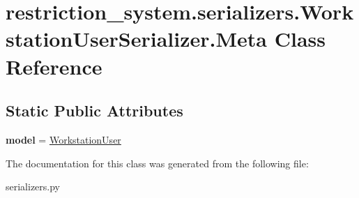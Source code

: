 \hypertarget{classrestriction__system_1_1serializers_1_1WorkstationUserSerializer_1_1Meta}{}\section{restriction\+\_\+system.\+serializers.\+Workstation\+User\+Serializer.\+Meta Class Reference}
\label{classrestriction__system_1_1serializers_1_1WorkstationUserSerializer_1_1Meta}
\subsection*{Static Public Attributes}
\begin{DoxyCompactItemize}
\item 
\hypertarget{classrestriction__system_1_1serializers_1_1WorkstationUserSerializer_1_1Meta_a333b4209c5ec6f651a45c3ef2574cccd}{}{\bfseries model} = \hyperlink{classrestriction__system_1_1models_1_1WorkstationUser}{Workstation\+User}\label{classrestriction__system_1_1serializers_1_1WorkstationUserSerializer_1_1Meta_a333b4209c5ec6f651a45c3ef2574cccd}

\end{DoxyCompactItemize}


The documentation for this class was generated from the following file\+:\begin{DoxyCompactItemize}
\item 
serializers.\+py\end{DoxyCompactItemize}
